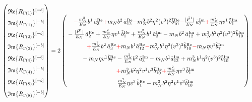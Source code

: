 \documentclass[]{article}
\numberwithin{equation}{section}
\newcommand{\bvec}{b}
\newcommand{\mN}{m_N}
\begin{document}
\begin{align}
    \begin{pmatrix}
        \rule{0pt}{16pt} \mathfrak{Re}\{ R_{\Gamma(1)}\}^{[-b]} \\
        \rule{0pt}{16pt} \mathfrak{Im}\{ R_{\Gamma(1)}\}^{[-b]} \\
        \rule{0pt}{16pt} \mathfrak{Re}\{ R_{\Gamma(2)}\}^{[-b]} \\
        \rule{0pt}{16pt} \mathfrak{Im}\{ R_{\Gamma(2)}\}^{[-b]} \\
        \rule{0pt}{16pt} \mathfrak{Re}\{ R_{\Gamma(4)}\}^{[-b]} \\
        \rule{0pt}{16pt} \mathfrak{Im}\{ R_{\Gamma(4)}\}^{[-b]} \\
        \rule{0pt}{16pt} \mathfrak{Re}\{ R_{\Gamma(8)}\}^{[-b]} \\
        \rule{0pt}{16pt} \mathfrak{Im}\{ R_{\Gamma(8)}\}^{[-b]}
    \end{pmatrix} &= 2\begin{pmatrix}
     \rule{0pt}{16pt}   \textcolor{red}{-}\frac{\mN^2}{E_N} \bvec^1\, \tilde a^{\text{Re}}_3\textcolor{red}{+}  \mN  \bvec^2 \, \tilde a^{\text{Re}}_{12}\textcolor{red}{-}  \mN^3  \bvec^2 \eta^2 (v^3)^2 \tilde b^{\text{Re}}_{10} \textcolor{red}{-}\frac{|\vec{P}^1|}{E_N}\, \tilde a^{\text{Im}}_2\textcolor{red}{+} \frac{\mN^2}{E_N} \eta v^1\, \tilde b^{\text{Im}}_1\\
      \rule{0pt}{16pt}  -\frac{|\vec{P}^1|}{E_N}\, \tilde a^{\text{Re}}_2+ \frac{\mN^2}{E_N} \eta v^1\, \tilde b^{\text{Re}}_1 + \frac{\mN^2}{E_N} \bvec^1\, \tilde a^{\text{Im}}_3- \mN  \bvec^2 \, \tilde a^{\text{Im}}_{12}+ \mN^3  \bvec^2 \eta^2 (v^3)^2 \tilde b^{\text{Im}}_{10}\\
      \rule{0pt}{16pt}  \textcolor{red}{+}  \frac{\mN^2}{E_N} \bvec^2\, \tilde a^{\text{Re}}_3
		\textcolor{red}{+}  \mN   \bvec^1  \tilde a^{\text{Re}}_{12}\textcolor{red}{-} \mN^3  \bvec^1 \eta^2 (v^3)^2 \tilde b^{\text{Re}}_{10}\textcolor{red}{-}\mN \eta v^1  \tilde b^{\text{Im}}_7 \\
      \rule{0pt}{16pt} - \mN \eta v^1  \tilde b^{\text{Re}}_7 - \frac{\mN^2}{E_N} \bvec^2\, \tilde a^{\text{Im}}_3
		- \mN   \bvec^1  \tilde a^{\text{Im}}_{12} +\mN^3  \bvec^1 \eta^2 (v^3)^2 \tilde b^{\text{Im}}_{10}\\
      \rule{0pt}{16pt} \textcolor{red}{+}\mN^3 \bvec^2 \eta^2 v^1 v^3\tilde b^{\text{Re}}_{10}\textcolor{red}{+}\frac{\mN^2}{E_N} \eta v^3\, \tilde b^{\text{Im}}_1\\
      \rule{0pt}{16pt} \frac{\mN^2}{E_N} \eta v^3\, \tilde b^{\text{Re}}_1 -\mN^3 \bvec^2 \eta^2 v^1 v^3\tilde b^{\text{Im}}_{10}\\

\end{pmatrix}
\end{align}
\end{document}
